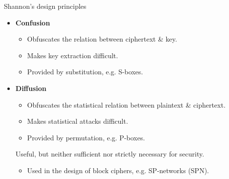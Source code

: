 \begin{frame}{Shannon's design principles}
  \begin{itemize}
    \pause
    \item \textbf{Confusion}
    \begin{itemize}
      \item Obfuscates the relation between ciphertext \& key.
      \item Makes key extraction difficult.
      \pause
      \item Provided by substitution, e.g. S-boxes.
    \end{itemize}

    \vspace*{1em}

    \pause
    \item \textbf{Diffusion}
    \begin{itemize}
      \item Obfuscates the statistical relation between plaintext \& ciphertext.
      \item Makes statistical attacks difficult.
      \pause
      \item Provided by permutation, e.g. P-boxes.
    \end{itemize}

    \vspace*{2em}

    \pause
    Useful, but neither sufficient nor strictly necessary for security.
    \begin{itemize}[<+(1)->]
      \item Used in the design of block ciphers, e.g. SP-networks (SPN).
    \end{itemize}
  \end{itemize}
\end{frame}


